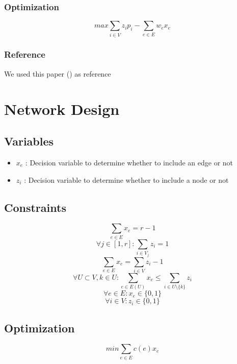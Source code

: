 \documentclass{article}
\begin{document}
\subsubsection{Optimization}
\[ max \sum_{i\in V}z_ip_i - \sum_{e\in E}w_ex_e \]

\subsubsection{Reference}
We used this paper (\cite{prize_collecting_steiner_tree_problem}) as reference

\clearpage

\section{Network Design}

\subsection{Variables}
\begin{itemize}
	\item $x_e$ : Decision variable to determine whether to include an edge or not
	\item $z_i$ : Decision variable to determine whether to include a node or not
\end{itemize}

\subsection{Constraints}
\[ \sum_{e\in E}x_e = r-1 \]
\[ \forall j \in [1,r] : \sum_{i\in V_j}z_i = 1 \]
\[ \sum_{e\in E}x_e = \sum_{i\in V}z_i - 1 \]
\[ \forall U \subset V, k \in U : \sum_{e\in E(U)}x_e \leq \sum_{i\in U \setminus \{k\}}z_i \]
\[ \forall e \in E : x_e \in \{0,1\} \]
\[ \forall i \in V : z_i \in \{0,1\} \]

\subsection{Optimization}
\[ min \sum_{e\in E}c(e)x_e \]

\clearpage

 

\end{document}
